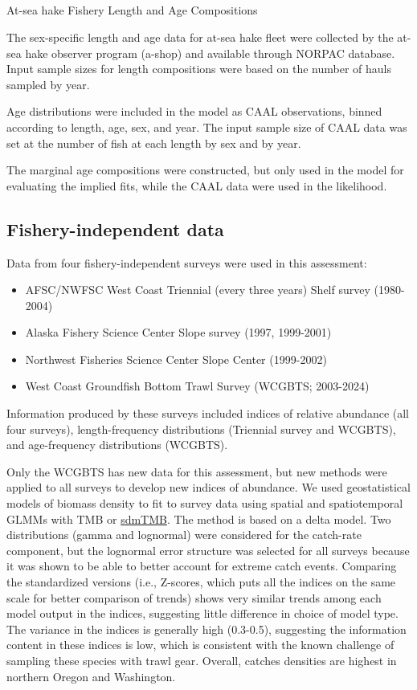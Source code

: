 \documentclass[
]{scrartcl}
\makeatletter
\let\oldsubparagraph\subparagraph
\renewcommand{\subparagraph}{
    \@ifstar
      \xxxSubParagraphStar
      \xxxSubParagraphNoStar
  }
\newcommand{\xxxSubParagraphStar}[1]{\oldsubparagraph*{#1}\mbox{}}
\newcommand{\xxxSubParagraphNoStar}[1]{\oldsubparagraph{#1}\mbox{}}
\providecommand{\tightlist}{%
  \setlength{\itemsep}{0pt}\setlength{\parskip}{0pt}}\usepackage{longtable,booktabs,array}
\makeatother
\begin{document}
\subparagraph{At-sea hake Fishery Length and Age
Compositions}\label{at-sea-hake-fishery-length-and-age-compositions}

The sex-specific length and age data for at-sea hake fleet were
collected by the at-sea hake observer program (a-shop) and available
through NORPAC database. Input sample sizes for length compositions were
based on the number of hauls sampled by year.

Age distributions were included in the model as CAAL observations,
binned according to length, age, sex, and year. The input sample size of
CAAL data was set at the number of fish at each length by sex and by
year.

The marginal age compositions were constructed, but only used in the
model for evaluating the implied fits, while the CAAL data were used in
the likelihood.

\subsection{Fishery-independent data}\label{fishery-independent-data}

Data from four fishery-independent surveys were used in this assessment:

\begin{itemize}
\tightlist
\item
  AFSC/NWFSC West Coast Triennial (every three years) Shelf survey
  (1980-2004)
\item
  Alaska Fishery Science Center Slope survey (1997, 1999-2001)
\item
  Northwest Fisheries Science Center Slope Center (1999-2002)
\item
  West Coast Groundfish Bottom Trawl Survey (WCGBTS; 2003-2024)
\end{itemize}

Information produced by these surveys included indices of relative
abundance (all four surveys), length-frequency distributions (Triennial
survey and WCGBTS), and age-frequency distributions (WCGBTS).

Only the WCGBTS has new data for this assessment, but new methods were
applied to all surveys to develop new indices of abundance. We used
geostatistical models of biomass density to fit to survey data using
spatial and spatiotemporal GLMMs with TMB or
\href{https://pbs-assess.github.io/sdmTMB/}{sdmTMB}. The method is based
on a delta model. Two distributions (gamma and lognormal) were
considered for the catch-rate component, but the lognormal error
structure was selected for all surveys because it was shown to be able
to better account for extreme catch events. Comparing the standardized
versions (i.e., Z-scores, which puts all the indices on the same scale
for better comparison of trends) shows very similar trends among each
model output in the indices, suggesting little difference in choice of
model type. The variance in the indices is generally high (0.3-0.5),
suggesting the information content in these indices is low, which is
consistent with the known challenge of sampling these species with trawl
gear. Overall, catches densities are highest in northern Oregon and
Washington.
\end{document}
